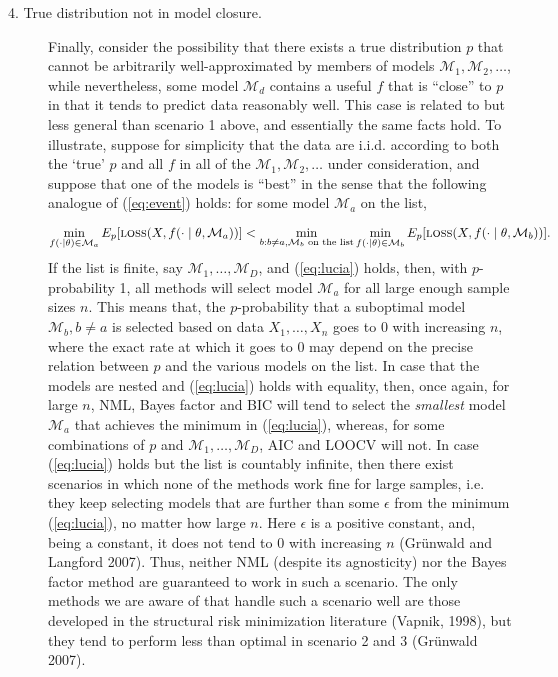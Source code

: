 \documentclass[authoryear]{elsarticle}
\newcommand{\loss}{\mbox{\sc loss}}
\newcommand{\model}{\mathcal{M}}
\begin{document}
\begin{description}
\item[4. True distribution not in model closure.] Finally, consider
  the possibility that there exists a true distribution $p$ that
  cannot be arbitrarily well-approximated by members of models
  $\model_1, \model_2, \ldots$, while nevertheless, some model
  $\model_d$ contains a useful $f$ that is ``close'' to $p$ in that it
  tends to predict data reasonably well.  This case is related to but
  less general than scenario 1 above, and essentially the same facts
  hold. To illustrate, suppose for simplicity that the data are i.i.d.
  according to both the `true' $p$ and all $f$ in all of the
  $\model_1, \model_2, \ldots$ under consideration, and suppose that
  one of the models is ``best'' in the sense that the following
  analogue of (\ref{eq:event}) holds: for some model $\model_a$ on the
  list,

\vspace*{-12pt}
\begin{equation}
\label{eq:lucia}
\min_{f(\cdot \mid \theta) \in \model_a}
E_{p} [\loss(X,f(\cdot \mid \theta,\model_a))]
<  \min_{b: b \neq a, \text{$\model_b$ on the list}} \min_{f(\cdot \mid \theta) \in \model_b}
E_{p} [
\loss(X,f(\cdot \mid {\theta}, \model_b))].
\end{equation}
If the list is finite, say $\model_1, \ldots, \model_D$, and
(\ref{eq:lucia}) holds, then, with $p$-probability 1, all methods will
select model $\model_a$ for all large enough sample sizes $n$. This
means that, the $p$-probability that a suboptimal model $\model_b, b
\neq a$ is selected based on data $X_1, \ldots, X_n$ goes to $0$ with
increasing $n$, where the exact rate at which it goes to $0$ may
depend on the precise relation between $p$ and the various models on
the list. In case that the models are nested and (\ref{eq:lucia})
holds with equality, then, once again, for large $n$, NML, Bayes
factor and BIC will tend to select the {\em smallest\/} model
$\model_a$ that achieves the minimum in (\ref{eq:lucia}), whereas, for
some combinations of $p$ and $\model_1, \ldots, \model_D$, AIC and
LOOCV will not.  In case (\ref{eq:lucia}) holds but the list is
countably infinite, then there exist scenarios in which none of the
methods work fine for large samples, i.e. they keep selecting models
that are further than some $\epsilon$ from the minimum
(\ref{eq:lucia}), no matter how large $n$.  Here $\epsilon$ is a
positive constant, and, being a constant, it does not tend to $0$ with
increasing $n$ (Gr\"unwald and Langford 2007).  Thus, neither NML
(despite its agnosticity) nor the Bayes factor method are guaranteed
to work in such a scenario.  The only methods we are aware of that
handle such a scenario well are those developed in the structural risk
minimization literature (Vapnik, 1998), but they tend to perform less
than optimal in scenario 2 and 3 (Gr\"unwald 2007).
\end{description}
\end{document}
